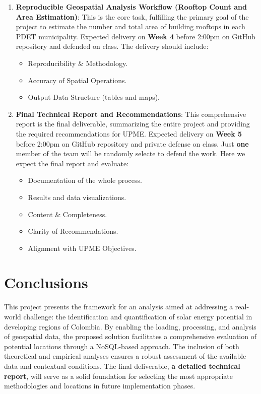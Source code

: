 \documentclass[12pt]{article}
\begin{document}
\begin{enumerate}
  \item \textbf{Reproducible Geospatial Analysis Workflow (Rooftop Count and Area Estimation)}: This is the core task, fulfilling the primary goal of the project to estimate the number and total area of building rooftops in each PDET municipality. Expected delivery on \textbf{Week 4} before 2:00pm on GitHub repository and defended on class. The delivery should include:
    \begin{itemize}
      \item Reproducibility \& Methodology.
      \item Accuracy of Spatial Operations.
      \item Output Data Structure (tables and maps).
    \end{itemize}

  \item \textbf{Final Technical Report and Recommendations}: This comprehensive report is the final deliverable, summarizing the entire project and providing the required recommendations for UPME. Expected delivery on \textbf{Week 5} before 2:00pm on GitHub repository and private defense on class.  Just \textbf{one} member of the team will be randomly selecte to defend the work. Here we expect the final report and evaluate:
    \begin{itemize}
      \item Documentation of the whole process.
      \item Results and data visualizations.
      \item Content \& Completeness.
      \item Clarity of Recommendations.
      \item Alignment with UPME Objectives.
    \end{itemize}

\end{enumerate}

\section{Conclusions}
This project presents the framework for an analysis aimed at addressing a real-world challenge: the identification and quantification of solar energy potential in developing regions of Colombia. By enabling the loading, processing, and analysis of geospatial data, the proposed solution facilitates a comprehensive evaluation of potential locations through a NoSQL-based approach. The inclusion of both theoretical and empirical analyses ensures a robust assessment of the available data and contextual conditions. The final deliverable, \textbf{a detailed technical report}, will serve as a solid foundation for selecting the most appropriate methodologies and locations in future implementation phases.
\end{document}
